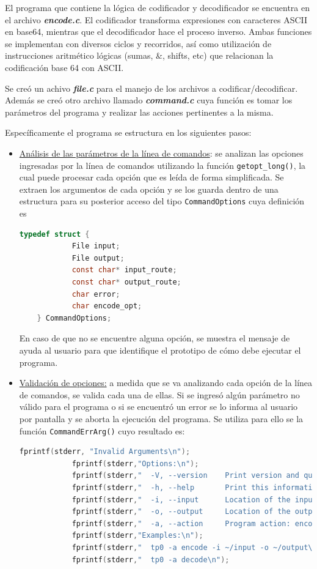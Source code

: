 \documentclass[10pt,a4paper]{article}
\begin{document}
El programa que contiene la lógica de codificador y decodificador se encuentra en el archivo \textit{\textbf{encode.c}}.
El codificador transforma expresiones con caracteres ASCII en base64, mientras que el decodificador hace el proceso inverso.
Ambas funciones se implementan con diversos ciclos y recorridos, así como utilización de instrucciones aritmético lógicas (sumas, \&, shifts, etc) que relacionan la codificación base 64 con ASCII.

Se creó un achivo \textit{\textbf{file.c}} para el manejo de los archivos a codificar/decodificar. Además se creó otro archivo llamado \textit{\textbf{command.c}} cuya función es tomar los parámetros del programa y realizar las acciones pertinentes a la misma. 

Específicamente el programa se estructura en los siguientes pasos:
\begin{itemize}
	\item \underline{Análisis de las parámetros de la línea de comandos}: se analizan las opciones ingresadas por la línea de comandos utilizando la función \texttt{getopt\_long()}, la cual puede procesar cada opción que es leída de forma simplificada. Se extraen los argumentos de cada opción y se los guarda dentro de una estructura para su posterior acceso del tipo \texttt{CommandOptions} cuya definición es
	\begin{lstlisting}[language=C]
	typedef struct {
    		File input;
    		File output;
    		const char* input_route;
    		const char* output_route;
    		char error;
    		char encode_opt;
	} CommandOptions;
	\end{lstlisting}
En caso de que no se encuentre alguna opción, se muestra el mensaje de ayuda al usuario para que identifique el prototipo de cómo debe ejecutar el programa.
	
	\item \underline{Validación de opciones:} a medida que se va analizando cada opción de la línea de comandos, se valida cada una de ellas. Si se ingresó algún parámetro no válido para el programa o si se encuentró un error se lo informa al usuario por pantalla y se aborta la ejecución del programa. Se utiliza para ello se la función \texttt{CommandErrArg()} cuyo resultado es:
	\begin{lstlisting}[language=C]
		fprintf(stderr, "Invalid Arguments\n");
    		fprintf(stderr,"Options:\n");
    		fprintf(stderr,"  -V, --version    Print version and quit.\n");
    		fprintf(stderr,"  -h, --help       Print this information.\n");
    		fprintf(stderr,"  -i, --input      Location of the input file.\n");
    		fprintf(stderr,"  -o, --output     Location of the output file.\n");
    		fprintf(stderr,"  -a, --action     Program action: encode (default) or decode.\n");
    		fprintf(stderr,"Examples:\n");
    		fprintf(stderr,"  tp0 -a encode -i ~/input -o ~/output\n");
    		fprintf(stderr,"  tp0 -a decode\n");
	\end{lstlisting}


\end{itemize}
\end{document}

